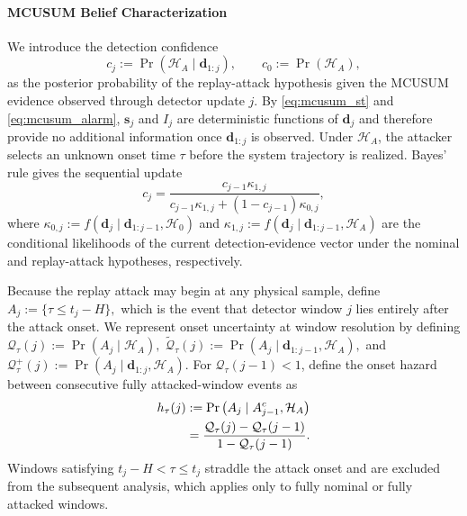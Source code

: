 \documentclass[letterpaper, 10 pt, conference]{ieeeconf}
\theoremstyle{plain}
\begin{document}
\paragraph{MCUSUM Belief Characterization} \label{subsec:belief_characterization}
We introduce the detection confidence
\begin{equation}\label{eq:confidence_definition}
c_j:=\Pr\left(\mathcal{H}_A\mid\mathbf{d}_{1:j}\right), \qquad
c_0:=\Pr(\mathcal{H}_A),
\end{equation}
as the posterior probability of the replay-attack hypothesis given the MCUSUM evidence observed through detector update $j$. By \eqref{eq:mcusum_st} and \eqref{eq:mcusum_alarm}, $\mathbf{s}_j$ and $I_j$ are deterministic functions of $\mathbf{d}_j$ and therefore provide no additional information once $\mathbf{d}_{1:j}$ is observed. Under $\mathcal{H}_A$, the attacker selects an unknown onset time $\tau$ before the system trajectory is realized. Bayes' rule gives the sequential update~\cite{aftabi2025dynamark}
\begin{equation}\label{eq:ct}
c_j = \frac{c_{j-1}\kappa_{1,j}}{c_{j-1}\kappa_{1,j} +(1-c_{j-1})\kappa_{0,j}},
\end{equation}
where $\kappa_{0,j} := f\left(\mathbf{d}_j \mid \mathbf{d}_{1:j-1},\mathcal{H}_0\right)$ and $\kappa_{1,j} := f\left(\mathbf{d}_j \mid \mathbf{d}_{1:j-1},\mathcal{H}_A\right)$ are the conditional likelihoods of the current detection-evidence vector under the nominal and replay-attack hypotheses, respectively.

Because the replay attack may begin at any physical sample, define $A_j:=\{\tau\le t_j-H\},$ which is the event that detector window $j$ lies entirely after the attack onset. We represent onset uncertainty at window resolution by defining $\mathcal{Q}_\tau(j) := \Pr(A_j\mid\mathcal{H}_A),$ $\widetilde{\mathcal{Q}}_\tau(j) := \Pr \left(A_j \mid \mathbf{d}_{1:j-1},\mathcal{H}_A\right),$ and $\mathcal{Q}_\tau^{+}(j) := \Pr\left(A_j \mid \mathbf{d}_{1:j},\mathcal{H}_A\right)$. For $\mathcal{Q}_\tau(j-1)<1$, define the onset hazard between consecutive fully attacked-window events as
\begin{align}\label{eq:onset_hazard}
h_\tau(j) &:= \Pr\left(A_j \mid A_{j-1}^{c},\mathcal{H}_A\right) \notag\\
&= \frac{\mathcal{Q}_\tau(j)-\mathcal{Q}_\tau(j-1)}{1-\mathcal{Q}_\tau(j-1)}.
\end{align}
Windows satisfying $t_j-H<\tau\le t_j$ straddle the attack onset and are excluded from the subsequent analysis, which applies only to fully nominal or fully attacked windows.
\end{document}
